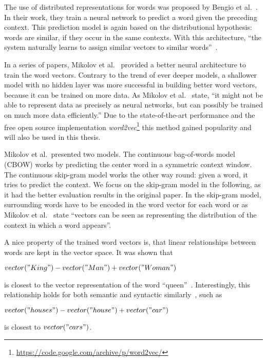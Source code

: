 \documentclass{sig-alternate-05-2015}
\begin{document}
The use of distributed representations for words was proposed by Bengio et al.~\cite{Bengio2003}.
In their work, they train a neural network to predict a word given the preceding context.
This prediction model is again based on the distributional hypothesis: words are similar, if they occur in the same contexts.
With this architecture, ``the system naturally learns to assign similar vectors to similar words''~\cite{Baroni2014}.

In a series of papers, Mikolov et al.~\cite{Mikolov2013,Mikolov2013a,Mikolov2013b} provided a better neural architecture to train the word vectors.
Contrary to the trend of ever deeper models, a shallower model with no hidden layer was more successful in building better word vectors, because it can be trained on more data.
As Mikolov et al.~\cite{Mikolov2013a} state, ``it might not be able to represent data as precisely as neural networks, but can possibly be trained on much more data efficiently.''
Due to the state-of-the-art performance and the free open source implementation \emph{word2vec}\footnote{\url{https://code.google.com/archive/p/word2vec/}} this method gained popularity and will also be used in this thesis.

Mikolov et al.\ presented two models.
The continuous bag-of-words model (CBOW) works by predicting the center word in a symmetric context window.
The continuous skip-gram model works the other way round: given a word, it tries to predict the context.
We focus on the skip-gram model in the following, as it had the better evaluation results in the original paper.
In the skip-gram model, surrounding words have to be encoded in the word vector for each word or as Mikolov et al.~\cite{Mikolov2013} state ``vectors can be seen as representing the distribution of the context in which a word appears''.

A nice property of the trained word vectors is, that linear relationships between words are kept in the vector space.
It was shown that
\begin{center}
       $vector("King") - vector("Man") + vector("Woman")$
\end{center}
is closest to the vector representation of the word ``queen''~\cite{Mikolov2013b}.
Interestingly, this relationship holds for both semantic and syntactic similarly~\cite{Mikolov2013a}, such as
\begin{center}
       $vector("houses") - vector("house") + vector("car")$
\end{center}
is closest to $vector("cars")$.
\end{document}
